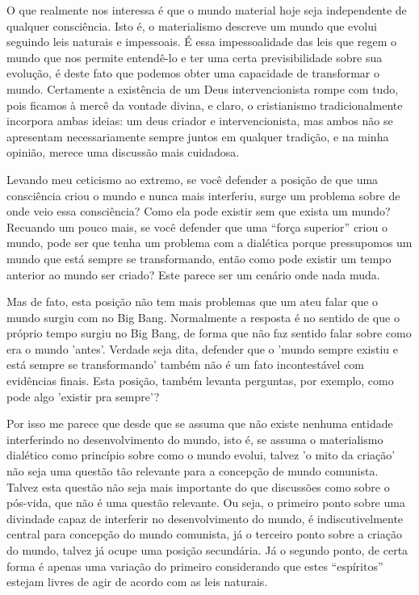 O que realmente nos interessa é que o mundo material hoje seja independente de qualquer consciência. Isto é, o materialismo descreve um mundo que evolui seguindo leis naturais e impessoais. É essa impessoalidade das leis que regem o mundo que nos permite entendê-lo e ter uma certa previsibilidade sobre sua evolução, é deste fato que podemos obter uma capacidade de transformar o mundo. Certamente a existência de um Deus intervencionista rompe com tudo, pois ficamos à mercê da vontade divina, e claro, o cristianismo tradicionalmente incorpora ambas ideias: um deus criador e intervencionista, mas ambos não se apresentam necessariamente sempre juntos em qualquer tradição, e na minha opinião, merece uma discussão mais cuidadosa.

Levando meu ceticismo ao extremo, se você defender a posição de que uma consciência criou o mundo e nunca mais interferiu, surge um problema sobre de onde veio essa consciência? Como ela pode existir sem que exista um mundo? Recuando um pouco mais, se você defender que uma “força superior” criou o mundo, pode ser que tenha um problema com a dialética porque pressupomos um mundo que está sempre se transformando, então como pode existir um tempo anterior ao mundo ser criado?  Este parece ser um cenário onde nada muda.

Mas de fato, esta posição não tem mais problemas que um ateu falar que o mundo surgiu com no Big Bang. Normalmente a resposta é no sentido de que o próprio tempo surgiu no Big Bang, de forma que não faz sentido falar sobre como era o mundo 'antes'. Verdade seja dita, defender que o 'mundo sempre existiu e está sempre se transformando' também não é um fato incontestável com evidências finais. Esta posição, também levanta perguntas, por exemplo, como pode algo 'existir pra sempre'? 

Por isso me parece que desde que se assuma que não existe nenhuma entidade interferindo no desenvolvimento do mundo, isto é, se assuma o materialismo dialético como princípio sobre como o mundo evolui, talvez 'o mito da criação' não seja uma questão tão relevante para a concepção de mundo comunista. Talvez esta questão não seja mais importante do que discussões como sobre o pós-vida,  que não é uma questão relevante. Ou seja, o primeiro ponto sobre uma divindade capaz de interferir no desenvolvimento do mundo, é indiscutivelmente central para concepção do mundo comunista, já o terceiro ponto sobre a criação do mundo, talvez já ocupe uma posição secundária. Já o segundo ponto, de certa forma é apenas uma variação do primeiro considerando  que estes “espíritos” estejam livres de agir de acordo com as leis naturais.

